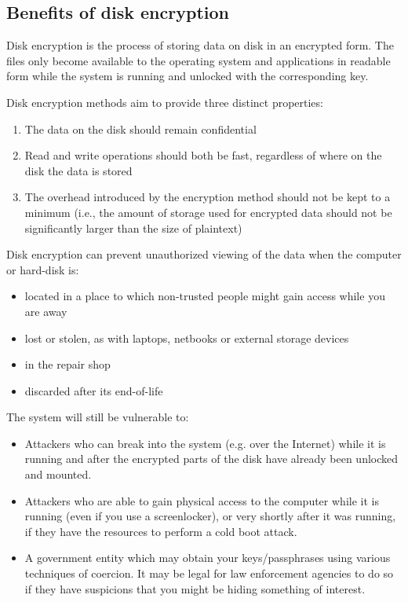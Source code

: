 \subsection{Benefits of disk encryption}
\label{sub-sec:benefits-enc}

Disk encryption is the process of storing data on disk in an encrypted form. The files only become available to the operating system and applications in readable form while the system is running and unlocked with the corresponding key.

Disk encryption methods aim to provide three distinct properties:
\begin{enumerate}
\item The data on the disk should remain confidential
\item Read and write operations should both be fast, regardless of where on the disk the data is stored
\item The overhead introduced by the encryption method should not be kept to a minimum (i.e., the amount of storage used for encrypted data should not be significantly larger than the size of plaintext)
\end{enumerate}

Disk encryption can prevent unauthorized viewing of the data when the computer or hard-disk is:
\begin{itemize}
\item located in a place to which non-trusted people might gain access while you are away
\item lost or stolen, as with laptops, netbooks or external storage devices
\item in the repair shop
\item discarded after its end-of-life
\end{itemize}

The system will still be vulnerable to:
\begin{itemize}
\item Attackers who can break into the system (e.g. over the Internet) while it is running and after the encrypted parts of the disk have already been unlocked and mounted.
\item Attackers who are able to gain physical access to the computer while it is running (even if you use a screenlocker), or very shortly after it was running, if they have the resources to perform a cold boot attack.
\item A government entity which may obtain your keys/passphrases using various techniques of coercion. It may be legal for law enforcement agencies to do so if they have suspicions that you might be hiding something of interest.
\end{itemize}

